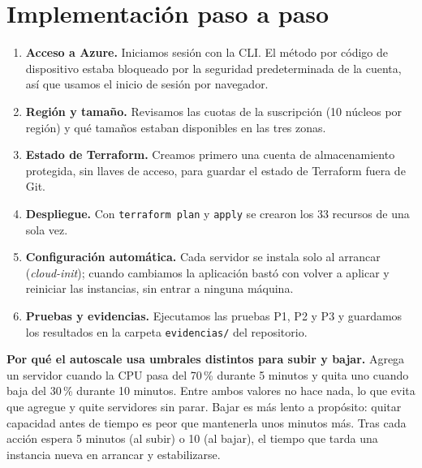 \documentclass[11pt,letterpaper]{article}
\begin{document}
\section{Implementación paso a paso}
\begin{enumerate}
  \item \textbf{Acceso a Azure.} Iniciamos sesión con la CLI. El método por código de dispositivo
        estaba bloqueado por la seguridad predeterminada de la cuenta, así que usamos el inicio
        de sesión por navegador.
  \item \textbf{Región y tamaño.} Revisamos las cuotas de la suscripción (10 núcleos por región)
        y qué tamaños estaban disponibles en las tres zonas.
  \item \textbf{Estado de Terraform.} Creamos primero una cuenta de almacenamiento protegida, sin
        llaves de acceso, para guardar el estado de Terraform fuera de Git.
  \item \textbf{Despliegue.} Con \texttt{terraform plan} y \texttt{apply} se crearon los 33 recursos
        de una sola vez.
  \item \textbf{Configuración automática.} Cada servidor se instala solo al arrancar
        (\emph{cloud-init}); cuando cambiamos la aplicación bastó con volver a aplicar y reiniciar
        las instancias, sin entrar a ninguna máquina.
  \item \textbf{Pruebas y evidencias.} Ejecutamos las pruebas P1, P2 y P3 y guardamos los resultados
        en la carpeta \texttt{evidencias/} del repositorio.
\end{enumerate}

\textbf{Por qué el autoscale usa umbrales distintos para subir y bajar.} Agrega un servidor cuando
la CPU pasa del 70\,\% durante 5 minutos y quita uno cuando baja del 30\,\% durante 10 minutos.
Entre ambos valores no hace nada, lo que evita que agregue y quite servidores sin parar. Bajar es
más lento a propósito: quitar capacidad antes de tiempo es peor que mantenerla unos minutos más.
Tras cada acción espera 5 minutos (al subir) o 10 (al bajar), el tiempo que tarda una instancia
nueva en arrancar y estabilizarse.

\end{document}
